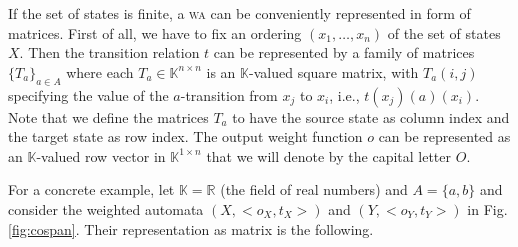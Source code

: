 \documentclass[3p]{elsarticle}
\newcommand{\setproduct}{\times} %
\newcommand{\K}{\mathbb{K}}            %
\begin{document}
If the set of states is finite, a \textsc{wa} can be conveniently
represented in form of matrices. First of all, we have to fix an
ordering $(x_1, \dots , x_n)$ of the set of states $X$. Then the
transition relation $t$ can be represented by a family of matrices
$\{T_a\}_{a\in A}$ where each $T_a\in \K^{n \setproduct n}$ is an
$\K$-valued square matrix, with $T_a(i,j)$ specifying the value of
the $a$-transition from $x_j$ to $x_i$, i.e., $t(x_j)(a)(x_i)$. Note that we define the matrices $T_a$ to have the source state as column index and the target state as row index. The
output weight function $o$ can be represented as an $\K$-valued row
vector in $\K^{1 \setproduct n}$ that we will denote by the capital
letter $O$.


For a concrete example, let $\K=\mathbb{R}$ (the field of real
numbers) and $A=\{a,b\}$ and consider the weighted automata $(X,
<o_X,t_X>)$ and $(Y, <o_Y,t_Y>)$ in Fig. \ref{fig:cospan}. Their
representation as matrix is the following.
%
\end{document}

